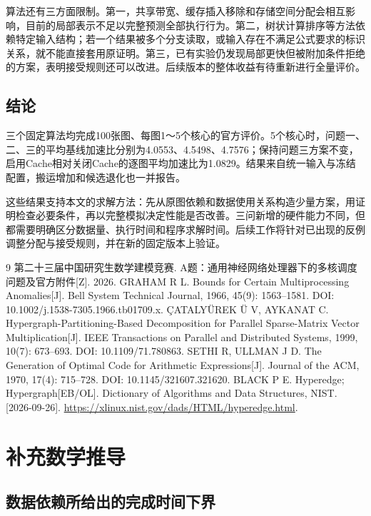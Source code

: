\documentclass[anonymous,notoc]{gmcm2026}
\begin{document}
算法还有三方面限制。第一，共享带宽、缓存插入移除和存储空间分配会相互影响，目前的局部表示不足以完整预测全部执行行为。第二，树状计算排序等方法依赖特定输入结构；若一个结果被多个分支读取，或输入存在不满足公式要求的标识关系，就不能直接套用原证明。第三，已有实验仍发现局部更快但被附加条件拒绝的方案，表明接受规则还可以改进。后续版本的整体收益有待重新进行全量评价。

\subsection{结论}

三个固定算法均完成100张图、每图1～5个核心的官方评价。5个核心时，问题一、二、三的平均基线加速比分别为4.0553、4.5498、4.7576；保持问题三方案不变，启用Cache相对关闭Cache的逐图平均加速比为1.0829。结果来自统一输入与冻结配置，搬运增加和候选退化也一并报告。

这些结果支持本文的求解方法：先从原图依赖和数据使用关系构造少量方案，用证明检查必要条件，再以完整模拟决定性能是否改善。三问新增的硬件能力不同，但都需要明确区分数据量、执行时间和程序求解时间。后续工作将针对已出现的反例调整分配与接受规则，并在新的固定版本上验证。


\FloatBarrier
\begin{thebibliography}{9}
 第二十三届中国研究生数学建模竞赛. A题：通用神经网络处理器下的多核调度问题及官方附件[Z]. 2026.
 GRAHAM R L. Bounds for Certain Multiprocessing Anomalies[J]. Bell System Technical Journal, 1966, 45(9): 1563--1581. DOI: 10.1002/j.1538-7305.1966.tb01709.x.
 ÇATALYÜREK Ü V, AYKANAT C. Hypergraph-Partitioning-Based Decomposition for Parallel Sparse-Matrix Vector Multiplication[J]. IEEE Transactions on Parallel and Distributed Systems, 1999, 10(7): 673--693. DOI: 10.1109/71.780863.
 SETHI R, ULLMAN J D. The Generation of Optimal Code for Arithmetic Expressions[J]. Journal of the ACM, 1970, 17(4): 715--728. DOI: 10.1145/321607.321620.
 BLACK P E. Hyperedge; Hypergraph[EB/OL]. Dictionary of Algorithms and Data Structures, NIST. [2026-09-26]. \url{https://xlinux.nist.gov/dads/HTML/hyperedge.html}.
\end{thebibliography}

\appendix
\setcounter{section}{1}
\section{补充数学推导}

\subsection{数据依赖所给出的完成时间下界}
\end{document}

